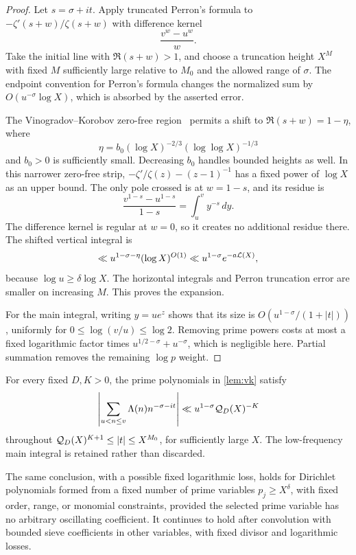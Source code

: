 \begin{proof}
Let $s=\sigma+it$. Apply truncated Perron's formula to
$-\zeta'(s+w)/\zeta(s+w)$ with difference kernel
\[
                    \frac{v^w-u^w}{w}.
\]
Take the initial line with $\Re(s+w)>1$, and choose a truncation height
$X^M$ with fixed $M$ sufficiently large relative to $M_0$ and the allowed
range of $\sigma$.
The endpoint convention for Perron's formula changes the normalized
sum by $O(u^{-\sigma}\log X)$, which is absorbed by the asserted error.

The Vinogradov--Korobov zero-free region~\cite{Ford,Ivi85} permits a shift to
$\Re(s+w)=1-\eta$, where
\[
 \eta=b_0(\log X)^{-2/3}(\log\log X)^{-1/3}
\]
and $b_0>0$ is sufficiently small. Decreasing $b_0$ handles bounded
heights as well. In this narrower zero-free strip,
$-\zeta'/\zeta(z)-(z-1)^{-1}$ has a fixed power of $\log X$ as an upper
bound. The only pole crossed is at $w=1-s$, and its residue is
\[
              \frac{v^{1-s}-u^{1-s}}{1-s}=\int_u^v y^{-s}\,dy.
\]
The difference kernel is regular at $w=0$, so it creates no additional
residue there. The shifted vertical integral is
\[
 \ll u^{1-\sigma-\eta}(\log X)^{O(1)}
 \ll u^{1-\sigma}e^{-a\mathcal L(X)},
\]
because $\log u\ge\delta\log X$. The horizontal integrals and Perron
truncation error are smaller on increasing $M$.
This proves the expansion.

For the main integral, writing $y=ue^z$ shows that its size is
$O(u^{1-\sigma}/(1+|t|))$, uniformly for $0\le\log(v/u)\le\log2$.
Removing prime powers costs at most a fixed logarithmic factor times
$u^{1/2-\sigma}+u^{-\sigma}$, which is negligible here.
Partial summation removes the remaining $\log p$ weight.
\end{proof}

\begin{corollary}\label{cor:Qinput}
For every fixed $D,K>0$, the prime polynomials in \cref{lem:vk} satisfy
\[
 \left|\sum_{u<n\le v}\Lambda(n)n^{-\sigma-it}\right|
 \ll u^{1-\sigma}\mathcal Q_D(X)^{-K}
\]
throughout $\mathcal Q_D(X)^{K+1}\le |t|\le X^{M_0}$, for sufficiently large $X$.
The low-frequency main integral is retained rather than discarded.
\end{corollary}

\begin{lemma}\label{lem:products}
The same conclusion, with a possible fixed logarithmic loss, holds for
Dirichlet polynomials formed from a fixed number of prime variables
$p_j\ge X^\delta$, with fixed order, range, or monomial constraints,
provided the selected prime variable has no arbitrary oscillating
coefficient.
It continues to hold after convolution with bounded sieve coefficients
in other variables, with fixed divisor and logarithmic losses.
\end{lemma}

